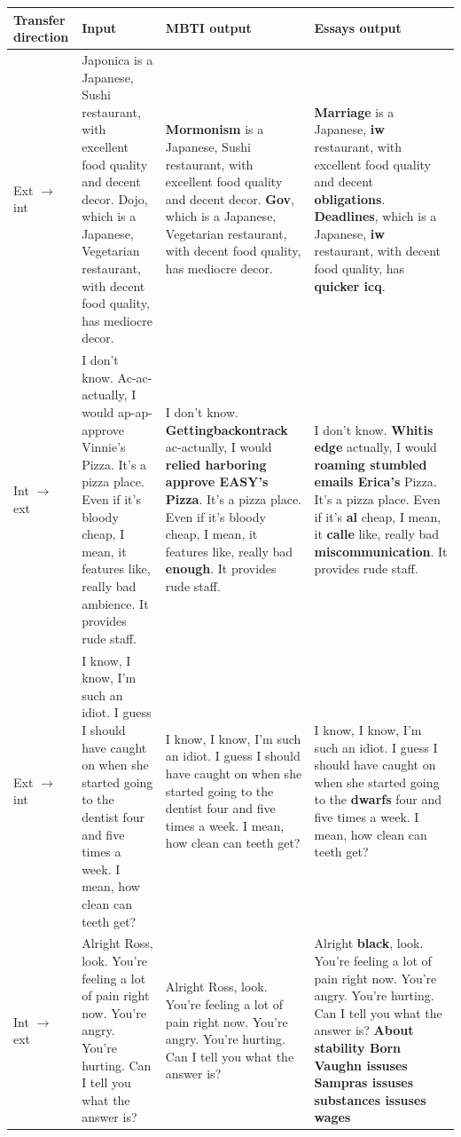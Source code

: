 \documentclass[nomenclature, english, biblatex]{kththesis}
\begin{document}
\begin{table}
    \centering
    \begin{adjustbox}{max width=\textwidth}
        \begin{tabular}{|p{}|p{}|p{}|p{}|}
        \hline
        Transfer direction & Input & MBTI output & Essays output \\
        \hline
        \hline
        Ext $\rightarrow$ int & Japonica is a Japanese, Sushi restaurant, with excellent food quality and decent decor. Dojo, which is a Japanese, Vegetarian restaurant, with decent food quality, has mediocre decor. & \textbf{Mormonism} is a Japanese, Sushi restaurant, with excellent food quality and decent decor. \textbf{Gov}, which is a Japanese, Vegetarian restaurant, with decent food quality, has mediocre decor. & \textbf{Marriage} is a Japanese, \textbf{iw} restaurant, with excellent food quality and decent \textbf{obligations}. \textbf{Deadlines}, which is a Japanese, \textbf{iw} restaurant, with decent food quality, has \textbf{quicker icq}.\\
        \hline
        Int $\rightarrow$ ext & I don't know. Ac-ac-actually, I would ap-ap-approve Vinnie's Pizza. It's a pizza place. Even if it's bloody cheap, I mean, it features like, really bad ambience. It provides rude staff. & I don't know. \textbf{Gettingbackontrack} ac-actually, I would \textbf{relied harboring approve EASY's Pizza}. It's a pizza place. Even if it's bloody cheap, I mean, it features like, really bad \textbf{enough}. It provides rude staff. & I don't know. \textbf{Whitis edge} actually, I would \textbf{roaming stumbled emails Erica's} Pizza. It's a pizza place. Even if it's \textbf{al} cheap, I mean, it \textbf{calle} like, really bad \textbf{miscommunication}. It provides rude staff.\\
        \hline
        Ext $\rightarrow$ int & I know, I know, I'm such an idiot. I guess I should have caught on when she started going to the dentist four and five times a week. I mean, how clean can teeth get? & I know, I know, I'm such an idiot. I guess I should have caught on when she started going to the dentist four and five times a week. I mean, how clean can teeth get? & I know, I know, I'm such an idiot. I guess I should have caught on when she started going to the \textbf{dwarfs} four and five times a week. I mean, how clean can teeth get?\\
        \hline
        Int $\rightarrow$ ext & Alright Ross, look. You're feeling a lot of pain right now. You're angry.  You're hurting.  Can I tell you what the answer is? & Alright Ross, look. You're feeling a lot of pain right now. You're angry.  You're hurting.  Can I tell you what the answer is? & Alright \textbf{black}, look. You're feeling a lot of pain right now. You're angry.  You're hurting.  Can I tell you what the answer is? \textbf{About stability Born Vaughn issuses Sampras issuses substances issuses wages}\\

\end{tabular}
\end{adjustbox}
\end{table}
\end{document}
